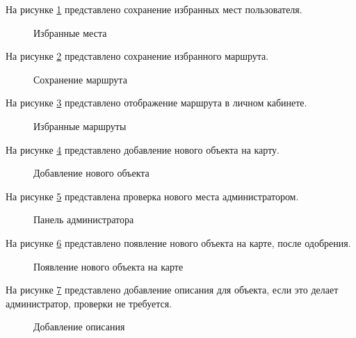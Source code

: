 \newpage
На рисунке \ref{r10:image} представлено сохранение избранных мест пользователя.

\begin{figure}[H]
	\center{\texttt{[image: r10]}}
	\caption{Избранные места}
	\label{r10:image}
\end{figure}

\newpage
На рисунке \ref{r12:image} представлено сохранение избранного маршрута.

\begin{figure}[H]
	\center{\texttt{[image: r12]}}
	\caption{Сохранение маршрута}
	\label{r12:image}
\end{figure}

\newpage
На рисунке \ref{r13:image} представлено отображение маршрута в личном кабинете.

\begin{figure}[H]
	\center{\texttt{[image: r13]}}
	\caption{Избранные маршруты}
	\label{r13:image}
\end{figure}

\newpage
На рисунке \ref{r14:image} представлено добавление нового объекта на карту.

\begin{figure}[H]
	\center{\texttt{[image: r14]}}
	\caption{Добавление нового объекта}
	\label{r14:image}
\end{figure}

\newpage
На рисунке \ref{r15:image} представлена проверка нового места администратором.

\begin{figure}[H]
	\center{\texttt{[image: r15]}}
	\caption{Панель администратора}
	\label{r15:image}
\end{figure}

\newpage
На рисунке \ref{r16:image} представлено появление нового объекта на карте, после одобрения.

\begin{figure}[H]
	\center{\texttt{[image: r16]}}
	\caption{Появление нового объекта на карте}
	\label{r16:image}
\end{figure}

\newpage
На рисунке \ref{r17:image} представлено добавление описания для объекта, если это делает администратор, проверки не требуется.

\begin{figure}[H]
	\center{\texttt{[image: r17]}}
	\caption{Добавление описания}
	\label{r17:image}
\end{figure}

